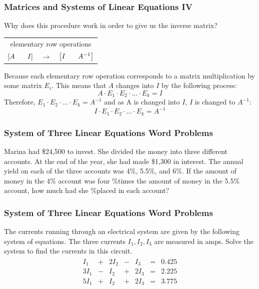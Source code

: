 \documentclass[xcolor=dvipsnames]{beamer}
\begin{document}
\begin{frame}
  \frametitle{Matrices and Systems of Linear Equations IV}
  Why does this procedure work in order to give us the inverse matrix?

  \medskip

  \begin{tabular}{rcl}
    \multicolumn{3}{c}{elementary row operations} \\
    $\left[A\hspace{0.25in}I\right]$ & $\longrightarrow$ & $\left[I\hspace{0.25in}A^{-1}\right]$ 
  \end{tabular}

  \medskip

  Because each elementary row operation corresponds to a matrix
  multiplication by some matrix $E_{i}$. This means that $A$ changes
  into $I$ by the following process:
  \begin{equation}
    \label{eq:wohfohho}
    A\cdot{}E_{1}\cdot{}E_{2}\cdot\ldots\cdot{}E_{k}=I
  \end{equation}
Therefore, $E_{1}\cdot{}E_{2}\cdot\ldots\cdot{}E_{k}=A^{-1}$ and as A
is changed into $I$, $I$ is changed to $A^{-1}$:
  \begin{equation}
    \label{eq:oothiera}
    I\cdot{}E_{1}\cdot{}E_{2}\cdot\ldots\cdot{}E_{k}=A^{-1}
  \end{equation}
\end{frame}

\begin{frame}
  \frametitle{System of Three Linear Equations Word Problems}
  {\ubung} Marina had \$24,500 to invest. She divided the money into
  three different accounts. At the end of the year, she had made
  \$1,300 in interest. The annual yield on each of the three accounts
  was 4\%, 5.5\%, and 6\%. If the amount of money in the 4\% account
  was four \%times the amount of money in the 5.5\% account, how much
  had she \%placed in each account?
\end{frame}

\begin{frame}
  \frametitle{System of Three Linear Equations Word Problems}
  {\ubung} The currents running through an electrical system are given
  by the following system of equations. The three currents $I_{1},I_{2},I_{3}$
  are measured in amps. Solve the system to find the currents in this
  circuit.
  \begin{align}
    \label{eq:oemeyeib}
    \begin{array}{clclclc}
    I_{1} & + & 2I_{2} & - & I_{3} & = & 0.425 \\
    3I_{1} & - & I_{2} & + & 2I_{3} & = & 2.225 \\
    5I_{1} & + & I_{2} & + & 2I_{3} & = & 3.775
    \end{array}
  \end{align}
\end{frame}
\end{document}
